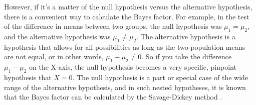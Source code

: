 \documentclass{ltjbook}
\begin{document}
However, if it's a matter of the null hypothesis versus the alternative hypothesis, there is a convenient way to calculate the Bayes factor. For example, in the test of the difference in means between two groups, the null hypothesis was $\mu_1=\mu_2$, and the alternative hypothesis was $\mu_1 \neq \mu_2$. The alternative hypothesis is a hypothesis that allows for all possibilities as long as the two population means are not equal, or in other words, $\mu_1-\mu_2\neq 0$. So if you take the difference $\mu_1-\mu_2$ on the X-axis, the null hypothesis becomes a very specific, pinpoint hypothesis that $X=0$. The null hypothesis is a part or special case of the wide range of the alternative hypothesis, and in such nested hypotheses, it is known that the Bayes factor can be calculated by the Savage-Dickey method \parencite{Lee201709}.

\end{document}
